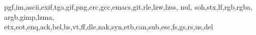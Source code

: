 \newcommand{\firstcharnode}[3]{  \node (#1) [hnode] {#2};
  \nodechar{#1}{#3}}

\newcommand{\restcharnode}[4]{
  \node (#1) [hnode,right=of #2] {#3};
  \nodechar{#1}{#4}
}

\newcommand*\algohack{\addtocontents{loa}{\vskip 9pt}}


\newcommand*\acronymstyle{\scshape}
\newcommand*\newacronym[1]{
  \expandafter\newcommand\csname#1\endcsname[1][]{{\acronymstyle#1}##1\xspace}}

\newcommand*{\newacronyms}{%
  \let\do\newacronym
  \docsvlist
}
\newacronyms{pgf,im,ascii,exif,tga,gif,png,crc,gcc,emacs,git,rle,lzw,lzss,
nul, soh,stx,lf,rgb,rgba, argb,gimp,lzma,
etx,eot,enq,ack,bel,bs,vt,ff,dle,nak,syn,etb,can,sub,esc,fs,gs,rs,us,del}

\newcommand*{\lzone}{{\acronymstyle lz\oldstylenums{77}}\xspace}
\newcommand*{\lztwo}{{\acronymstyle lz\oldstylenums{78}}\xspace}

\newcommand*{\cret}{{\acronymstyle cr}\xspace}
\newcommand*{\htab}{{\acronymstyle ht}\xspace}
\newcommand*{\nullm}{{\acronymstyle null}\xspace}
\newcommand*{\lzfam}{{\acronymstyle lz}-family\xspace}
\newcommand*{\sout}{{\acronymstyle so}\xspace}
\newcommand*{\shiftin}{{\acronymstyle si}\xspace}
\newcommand*{\emed}{{\acronymstyle em}\xspace}

\newcommand*{\crlf}{{\acronymstyle crlf}\xspace}


\newcommand*{\dc}[1]{{\acronymstyle dc#1}\xspace}


\newcommand*{\crcst}{{\acronymstyle crc-16}\xspace}

\newcommand{\deflate}{Deflate\xspace}
